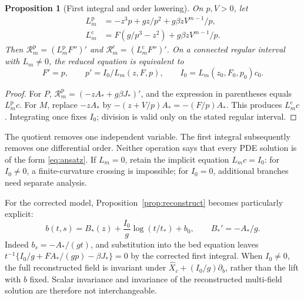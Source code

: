 \documentclass[11pt,a4paper,oneside]{report}
\numberwithin{equation}{chapter}
\newtheorem{proposition}[theorem]{Proposition}
\newcommand{\R}{\mathcal R}
\begin{document}
\begin{proposition}[First integral and order lowering]\label{prop:integral}
On $p,V>0$, let
\begin{align}
L_m^{\mathrm p}&=-z^3p+gz/p^2+g\beta zV^{m-1}/p,\label{eq:Lp}\\
L_m^{\mathrm c}&=F(g/p^3-z^2)+g\beta zV^{m-1}/p.\label{eq:Lc}
\end{align}
Then $\R_m^{\mathrm p}=(L_m^{\mathrm p}F'')'$ and $\R_m^{\mathrm c}=(L_m^{\mathrm c}F'')'$. On a connected regular interval with $L_m\ne0$, the reduced equation is equivalent to
\begin{equation}\label{eq:ivp}
F'=p,\qquad p'=I_0/L_m(z,F,p),\qquad
I_0=L_m(z_0,F_0,p_0)c_0.
\end{equation}
\end{proposition}
\begin{proof}
For $P$, $\R_m^{\mathrm p}=(-zA_*+g\beta J_*)'$, and the expression in parentheses equals $L_m^{\mathrm p}c$. For $M$, replace $-zA_*$ by $-(z+V/p)A_*=-(F/p)A_*$. This produces $L_m^{\mathrm c}c$. Integrating once fixes $I_0$; division is valid only on the stated regular interval.\end{proof}
The quotient removes one independent variable. The first integral subsequently removes one differential order. Neither operation says that every PDE solution is of the form \eqref{eq:ansatz}. If $L_m=0$, retain the implicit equation $L_mc=I_0$: for $I_0\ne0$, a finite-curvature crossing is impossible; for $I_0=0$, additional branches need separate analysis.

For the corrected model, Proposition~\ref{prop:reconstruct} becomes particularly explicit:
\begin{equation}\label{eq:bedprofile}
b(t,s)=B_*(z)+\frac{I_0}{g}\log(t/t_*)+b_0,
\qquad B_*'=-A_*/g.
\end{equation}
Indeed $b_s=-A_*/(gt)$, and substitution into the bed equation leaves
$t^{-1}\{I_0/g+FA_*/(gp)-\beta J_*\}=0$ by the corrected first integral. When $I_0\ne0$, the full reconstructed field is invariant under
$\widehat X_c+(I_0/g)\partial_b$, rather than the lift with $b$ fixed. Scalar invariance and invariance of the reconstructed multi-field solution are therefore not interchangeable.
\end{document}
